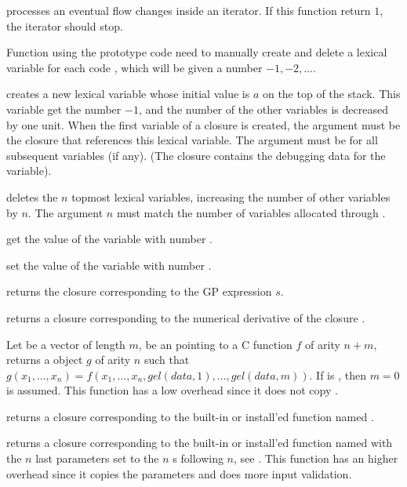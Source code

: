  processes an eventual flow changes inside an
iterator. If this function return $1$, the iterator should stop.

\label{se:pushlex}

Function using the prototype code  need to manually create and delete a
lexical variable for each code , which will be given a number $-1, -2,
\ldots$.

 creates a new lexical variable whose
initial value is $a$ on the top of the stack. This variable get the number
$-1$, and the number of the other variables is decreased by one unit. When
the first variable of a closure is created, the argument  must be the
closure that references this lexical variable. The argument  must be
 for all subsequent variables (if any).  (The closure contains the
debugging data for the variable).

 deletes the $n$ topmost lexical variables,
increasing the number of other variables by $n$. The argument $n$ must match
the number of variables allocated through .

 get the value of the variable with number .

 set the value of the variable with number
.


 returns the closure corresponding to the
GP expression $s$.

 returns a closure corresponding to the
numerical derivative of the closure .

Let  be a vector of length $m$,  be an 
pointing to a C function $f$ of arity $n+m$, returns a  object
$g$ of arity $n$ such that
$g(x_1,\ldots,x_n)=f(x_1,\ldots,x_n,gel(data,1),...,gel(data,m))$. If
 is , then $m=0$ is assumed.  This function has a low
overhead since it does not copy .

 returns a closure corresponding to the
built-in or install'ed function named .

 returns a closure
corresponding to the built-in or install'ed function named  with the
$n$ last parameters set to the $n$ s following $n$, see
. This function has an higher overhead since it copies the
parameters and does more input validation.

